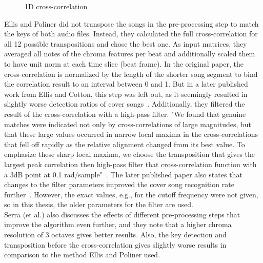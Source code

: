 \begin{figure}[htbp]
	\centering
	\caption{1D cross-correlation}
	\label{fig:corr1}
\end{figure}
Ellis and Poliner did not transpose the songs in the pre-processing step to match the keys of both audio files. Instead, they calculated the full cross-correlation for all 12 possible transpositions and chose the best one. 
As input matrices, they averaged all notes of the chroma features per beat and additionally scaled them to have unit norm at each time slice (beat frame).
In the original paper, the cross-correlation is normalized by the length of the shorter song segment to bind the correlation result to an interval between 0 and 1. But in a later published work from Ellis and Cotton, this step was left out, as it seemingly resulted in slightly worse detection ratios of cover songs~\cite{cover802}. 
Additionally, they filtered the result of the cross-correlation with a high-pass filter. "We found that genuine matches were indicated not only by cross-correlations of large magnitudes, but that these large values occurred in narrow local maxima in the cross-correlations that fell off rapidly as the relative alignment changed from its best value. To emphasize these sharp local maxima, we choose the transposition that gives the largest peak correlation then high-pass filter that cross-correlation function with a 3dB point at 0.1 rad/sample"~\cite[p. 3]{chroma3}. The later published paper also states that changes to the filter parameters improved the cover song recognition rate further~\cite{cover802}. However, the exact values, e.g., for the cutoff frequency were not given, so in this thesis, the older parameters for the filter are used.\\
Serra (et al.) also discusses the effects of different pre-processing steps that improve the algorithm even further, and they note that a higher chroma resolution of 3 octaves gives better results. Also, the key detection and transposition before the cross-correlation gives slightly worse results in comparison to the method Ellis and Poliner used.\\ 
